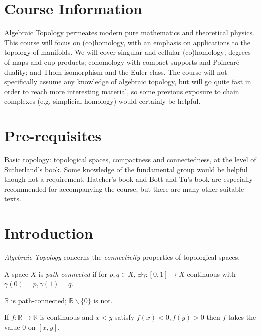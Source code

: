 \documentclass[a4paper,11pt]{article}
\begin{document}
	\maketitlepage
	\preliminaries

	\section*{Course Information}

	Algebraic Topology permeates modern pure mathematics and theoretical physics. This course will focus on (co)homology, with an emphasis on applications to the topology of manifolds. We will cover singular and cellular (co)homology; degrees of maps and cup-products; cohomology with compact supports and Poincar\'e duality; and Thom isomorphism and the Euler class. The course will not specifically assume any knowledge of algebraic topology, but will go quite fast in order to reach more interesting material, so some previous exposure to chain complexes (e.g. simplicial homology) would certainly be helpful.
	
	\section*{Pre-requisites}

	Basic topology: topological spaces, compactness and connectedness, at the level of Sutherland’s book. Some knowledge of the fundamental group would be helpful though not a requirement. Hatcher’s book and Bott and Tu’s book are especially recommended for accompanying the course, but there are many other suitable texts.

	\newpage
	\tableofcontents
	\newpage
	\maintext
	\setcounter{section}{-1}
	\section{Introduction} 
	
	\emph{Algebraic Topology} concerns the \emph{connectivity} properties of topological spaces.

	\begin{defi}
		A space $X$ is \emph{path-connected} if for $p,q\in X$, $\exists \gamma: [0,1] \to X$ continuous with $\gamma(0) = p, \gamma(1) = q$. 
	\end{defi}


	\begin{ex}
		$\mathbb{R}$ is path-connected; $\mathbb{R} \backslash \{0\}$ is not.
	\end{ex}

	\begin{cor}
		If $f : \mathbb{R} \to \mathbb{R}$ is continuous and $x < y$ satisfy $f(x)<0, f(y)>0$ then $f$ takes the value 0 on $[x,y]$.
	\end{cor}
\end{document}
